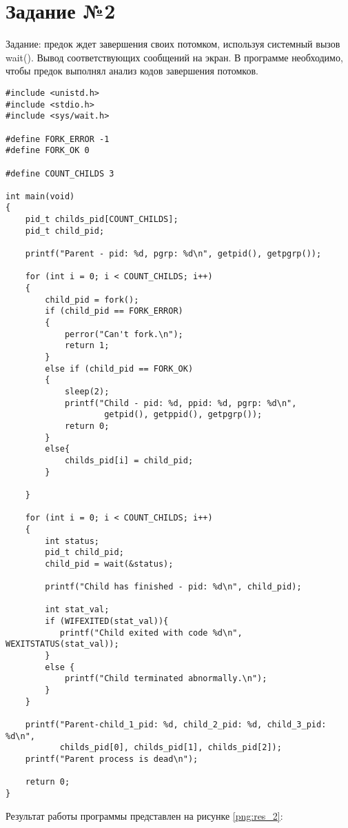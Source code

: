 \chapter*{Задание №2}
Задание: предок ждет завершения своих потомком, используя системный вызов wait(). Вывод соответствующих сообщений на экран. В программе необходимо, чтобы предок выполнял анализ кодов завершения потомков.

\begin{lstlisting}[label = wait, caption=Использование системного вызова wait().]
#include <unistd.h>
#include <stdio.h>
#include <sys/wait.h>

#define FORK_ERROR -1
#define FORK_OK 0

#define COUNT_CHILDS 3

int main(void)
{
	pid_t childs_pid[COUNT_CHILDS];
	pid_t child_pid;
	
	printf("Parent - pid: %d, pgrp: %d\n", getpid(), getpgrp());
	
	for (int i = 0; i < COUNT_CHILDS; i++)
	{
		child_pid = fork();
		if (child_pid == FORK_ERROR)
		{
			perror("Can't fork.\n");
			return 1;
		}
		else if (child_pid == FORK_OK)
		{
			sleep(2);
			printf("Child - pid: %d, ppid: %d, pgrp: %d\n",
			        getpid(), getppid(), getpgrp());
			return 0;
		}
		else{
			childs_pid[i] = child_pid;
		}
		
	}
	
	for (int i = 0; i < COUNT_CHILDS; i++)
	{
		int status;
		pid_t child_pid;
		child_pid = wait(&status);
		
		printf("Child has finished - pid: %d\n", child_pid);
		
		int stat_val;
		if (WIFEXITED(stat_val)){
		   printf("Child exited with code %d\n", WEXITSTATUS(stat_val));
		}
		else {
			printf("Child terminated abnormally.\n");
		}
	}
	
	printf("Parent-child_1_pid: %d, child_2_pid: %d, child_3_pid: %d\n",
	       childs_pid[0], childs_pid[1], childs_pid[2]);
	printf("Parent process is dead\n");
	
	return 0;
}
\end{lstlisting}


Результат работы программы представлен на рисунке \ref{png:res_2}:

\begin{figure}[H]
\end{figure}